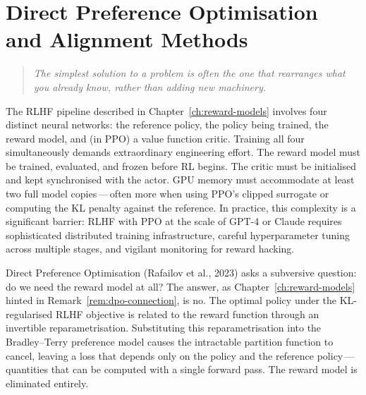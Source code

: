\chapter[DPO and Alignment Methods]{Direct Preference Optimisation and Alignment Methods}
\label{ch:dpo}

\begin{quote}
\itshape
The simplest solution to a problem is often the one that rearranges what you already know, rather than adding new machinery.
\end{quote}

\bigskip

The RLHF pipeline described in Chapter~\ref{ch:reward-models} involves four distinct neural networks: the reference policy, the policy being trained, the reward model, and (in PPO) a value function critic. Training all four simultaneously demands extraordinary engineering effort. The reward model must be trained, evaluated, and frozen before RL begins. The critic must be initialised and kept synchronised with the actor. GPU memory must accommodate at least two full model copies\,---\,often more when using PPO's clipped surrogate or computing the KL penalty against the reference. In practice, this complexity is a significant barrier: RLHF with PPO at the scale of GPT-4 or Claude requires sophisticated distributed training infrastructure, careful hyperparameter tuning across multiple stages, and vigilant monitoring for reward hacking.

Direct Preference Optimisation (Rafailov et al., 2023) asks a subversive question: do we need the reward model at all? The answer, as Chapter~\ref{ch:reward-models} hinted in Remark~\ref{rem:dpo-connection}, is no. The optimal policy under the KL-regularised RLHF objective is related to the reward function through an invertible reparametrisation. Substituting this reparametrisation into the Bradley--Terry preference model causes the intractable partition function to cancel, leaving a loss that depends only on the policy and the reference policy\,---\,quantities that can be computed with a single forward pass. The reward model is eliminated entirely.


